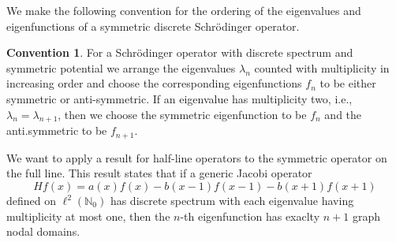 \documentclass[12pt, reqno]{amsart}
\theoremstyle{definition}
\newtheorem*{convention}{Convention}
\numberwithin{equation}{section}
\begin{document}
We  make the following convention for the ordering of the eigenvalues and eigenfunctions of a symmetric discrete Schr\"odinger operator.

\begin{convention}
For a Schrödinger operator with discrete spectrum and symmetric potential we arrange 
 the eigenvalues $\lambda_n$ counted with multiplicity  in increasing order and choose the corresponding eigenfunctions $f_n$ to be either symmetric or anti-symmetric.  
If an eigenvalue has multiplicity two, i.e., $\lambda_n = \lambda_{n+1}$, then we choose the symmetric eigenfunction to be $f_n$ and the anti.symmetric to be  $f_{n+1}$.
\end{convention}


We want to apply a result for half-line operators  \cite[Corollary 4.9]{Teschl2000} to the symmetric operator on the full line. This result states that if  a generic  Jacobi operator \begin{equation*}
	H f(x) = a(x)f(x)-b(x-1)f(x-1) -b(x+1) f(x+1)
\end{equation*}
defined on  $\ell^2(\mathbb{N}_0)$ has discrete spectrum with each eigenvalue having multiplicity at most one, then the $n$-th eigenfunction 
 has exaclty $n+1$ graph nodal domains.


 
\end{document}
